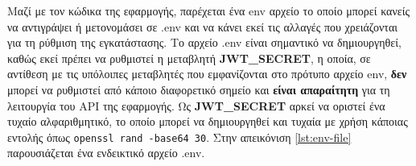 Μαζί με τον κώδικα της εφαρμογής, παρέχεται ένα env αρχείο το οποίο μπορεί κανείς να αντιγράψει ή μετονομάσει σε .env και να κάνει εκεί τις αλλαγές που χρειάζονται για τη ρύθμιση της εγκατάστασης. Το αρχείο .env είναι σημαντικό να δημιουργηθεί, καθώς εκεί πρέπει να ρυθμιστεί η μεταβλητή \textbf{JWT\_SECRET}, η οποία, σε αντίθεση με τις υπόλοιπες μεταβλητές που εμφανίζονται στο πρότυπο αρχείο env, \textbf{δεν} μπορεί να ρυθμιστεί από κάποιο διαφορετικό σημείο και \textbf{είναι απαραίτητη} για τη λειτουργία του API της εφαρμογής. Ως \textbf{JWT\_SECRET} αρκεί να οριστεί ένα τυχαίο αλφαριθμητικό, το οποίο μπορεί να δημιουργηθεί και τυχαία με χρήση κάποιας εντολής όπως \verb!openssl rand -base64 30!. Στην απεικόνιση \ref{lst:env-file} παρουσιάζεται ένα ενδεικτικό αρχείο .env.


